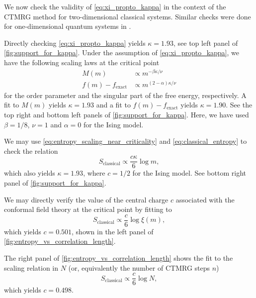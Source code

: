 We now check the validity of \autoref{eq:xi_propto_kappa} in the context of the CTMRG method for two-dimensional
classical systems. Similar checks were done for one-dimensional quantum systems in \cite{tagliacozzo2008scaling}.

Directly checking \autoref{eq:xi_propto_kappa} yields $\kappa = 1.93$, see top left panel of
\autoref{fig:support_for_kappa}.
Under the assumption of \autoref{eq:xi_propto_kappa}, we have the following scaling laws at the critical point
\begin{align}\label{eq:scaling_laws_order_param_free_energy_kappa}
  M(m) & \propto m^{-\beta \kappa / \nu} \\
  f(m) - f_{\text{exact}} & \propto m^{(2-\alpha)\kappa / \nu}
\end{align}
for the order parameter and the singular part of the free energy, respectively. A fit to $M(m)$ yields $\kappa = 1.93$
and a fit to $f(m) - f_{\text{exact}}$ yields $\kappa = 1.90$. See the top right and bottom left panels of
\autoref{fig:support_for_kappa}. Here, we have used $\beta = 1/8$, $\nu = 1$ and $\alpha = 0$ for the Ising model.

We may use \autoref{eq:entropy_scaling_near_criticality} and \autoref{eq:classical_entropy} to check the
relation
\begin{equation}\label{eq:scaling_law_entropy_kappa}
  S_{\text{classical}} \propto \frac{c\kappa}{6}\log m,
\end{equation}
which also yields $\kappa = 1.93$, where $c = 1/2$ for the Ising model. See bottom right panel of
\autoref{fig:support_for_kappa}.

We may directly verify the value of the central charge $c$ associated with the conformal field theory at the critical
point by fitting to
\begin{equation}\label{eq:entropy_vs_correlation_length}
  S_{\text{classical}} \propto \frac{c}{6} \log \xi(m),
\end{equation}
which yields $c = 0.501$, shown in the left panel of \autoref{fig:entropy_vs_correlation_length}.

The right panel of \autoref{fig:entropy_vs_correlation_length} shows the fit to the scaling relation in $N$ (or,
equivalently the number of CTMRG steps $n$)
\begin{equation}\label{eq:entropy_vs_N}
  S_{\text{classical}} \propto \frac{c}{6} \log N,
\end{equation}
which yields $c = 0.498$.

